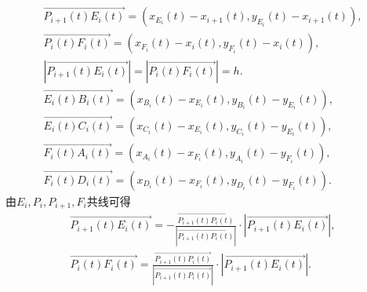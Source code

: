 \documentclass[../main.tex]{subfiles}
\begin{document}
     \begin{gather}
     \overrightarrow{P_{i+1}\left( t \right) E_i\left( t \right) }=\left( x_{E_i}\left( t \right) -x_{i+1}\left( t \right) ,y_{E_i}\left( t \right) -x_{i+1}\left( t \right) \right) ,\label{problem-2.4}
     \\
     \overrightarrow{P_i\left( t \right) F_i\left( t \right) }=\left( x_{F_i}\left( t \right) -x_i\left( t \right) ,y_{F_i}\left( t \right) -x_i\left( t \right) \right) ,\label{problem-2.5}
     \\
     \left| \overrightarrow{P_{i+1}\left( t \right) E_i\left( t \right) } \right|=\left| \overrightarrow{P_i\left( t \right) F_i\left( t \right) } \right|=h.\label{problem-2.6}
     \\
     \overrightarrow{E_i\left( t \right) B_i\left( t \right) }=\left( x_{B_i}\left( t \right) -x_{E_i}\left( t \right) ,y_{B_i}\left( t \right) -y_{E_i}\left( t \right) \right) ,\label{problem-2..1}
     \\
     \overrightarrow{E_i\left( t \right) C_i\left( t \right) }=\left( x_{C_i}\left( t \right) -x_{E_i}\left( t \right) ,y_{C_i}\left( t \right) -y_{E_i}\left( t \right) \right) ,\label{problem-2..2}
     \\
     \overrightarrow{F_i\left( t \right) A_i\left( t \right) }=\left( x_{A_i}\left( t \right) -x_{F_i}\left( t \right) ,y_{A_i}\left( t \right) -y_{F_i}\left( t \right) \right) ,\label{problem-2..3}
     \\
     \overrightarrow{F_i\left( t \right) D_i\left( t \right) }=\left( x_{D_i}\left( t \right) -x_{F_i}\left( t \right) ,y_{D_i}\left( t \right) -y_{F_i}\left( t \right) \right) .\label{problem-2..4}
     \end{gather}
     由$E_i,P_i,P_{i+1},F_i$共线可得
     \begin{gather}
     \overrightarrow{P_{i+1}\left( t \right) E_i\left( t \right) }=-\frac{\overrightarrow{P_{i+1}\left( t \right) P_i\left( t \right) }}{\left| \overrightarrow{P_{i+1}\left( t \right) P_i\left( t \right) } \right|}\cdot \left| \overrightarrow{P_{i+1}\left( t \right) E_i\left( t \right) } \right|,\label{problem-2.7}
     \\
     \overrightarrow{P_i\left( t \right) F_i\left( t \right) }=\frac{\overrightarrow{P_{i+1}\left( t \right) P_i\left( t \right) }}{\left| \overrightarrow{P_{i+1}\left( t \right) P_i\left( t \right) } \right|}\cdot \left| \overrightarrow{P_{i+1}\left( t \right) E_i\left( t \right) } \right|.\label{problem-2.8}
     \end{gather}
\end{document}
